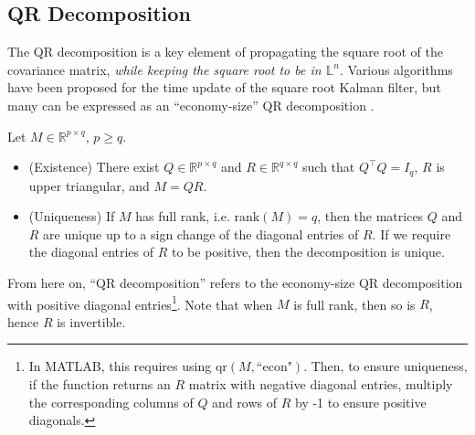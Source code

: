 \subsection{QR Decomposition}

The QR decomposition is a key element of propagating the square root of the covariance matrix, \textit{while keeping the square root to be in \(\mathbb{L}^n\)}. Various algorithms have been proposed for the time update of the square root Kalman filter, but many can be expressed as an ``economy-size'' QR decomposition \cite{tapleyStatisticalOrbitDetermination2004}.

\begin{lemma}\label{lemma:existence_and_uniqueness_of_economy_size_qr_decomposition}
	Let \( M \in \mathbb{R}^{p \times q} \), \(p \geq q\).
	\begin{itemize}
		\item (Existence) There exist \(Q \in \mathbb{R}^{p \times q}\) and \(R \in \mathbb{R}^{q \times q}\) such that \(Q^\top Q = I_q\), \(R\) is upper triangular, and \(M = QR\).
		\item (Uniqueness) If \(M\) has full rank, i.e. \(\mathrm{rank}(M) = q\), then the matrices \(Q\) and \(R\) are unique up to a sign change of the diagonal entries of \(R\). If we require the diagonal entries of \( R \) to be positive, then the decomposition is unique.
	\end{itemize}
\end{lemma}
From here on, ``QR decomposition'' refers to the economy-size QR decomposition with positive diagonal entries\footnote{In MATLAB, this requires using $\mathrm{qr}(M, \text{``econ"})$. Then, to ensure uniqueness, if the function returns an \( R \) matrix with negative diagonal entries, multiply the corresponding columns of \( Q \) and rows of \( R \) by -1 to ensure positive diagonals.}.
Note that when \(M\) is full rank, then so is \(R\), hence \(R\) is invertible.

